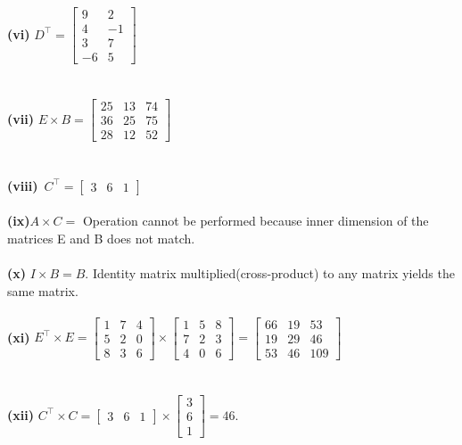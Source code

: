 \documentclass{article}
\begin{document}
\textbf{(vi)} ${D}^\top =
\left[
\begin{matrix}
9&2\\
4&-1\\
3&7\\
-6&5
\end{matrix}
\right]$\\ \\ \\
\textbf{(vii)} $E \times B = \left[
\begin{matrix}
25&13&74\\
36&25&75\\
28&12&52
\end{matrix}
\right]$\\ \\ \\
\textbf{(viii)}\, ${C}^\top =\left[
\begin{matrix}
3&6&1
\end{matrix}
\right]$\\ \\
\textbf{(ix)}$A \times C =$ Operation cannot be performed because inner dimension of the matrices E and B does not match.\\ \\
\textbf{(x)} $I \times B = B$. Identity matrix multiplied(cross-product) to any matrix yields the same matrix.\\ \\
\textbf{(xi)} ${E}^\top \times E =
\left[
\begin{matrix}
1&7&4\\
5&2&0\\
8&3&6
\end{matrix}
\right] \times  
\left[
\begin{matrix}
1&5&8\\
7&2&3\\
4&0&6
\end{matrix}
\right] = 
\left[
\begin{matrix}
66&19&53\\
19&29&46\\
53&46&109
\end{matrix}
\right]$\\ \\ \\
\textbf{(xii)} ${C}^\top \times C = \left[
\begin{matrix}
3&6&1
\end{matrix}
\right]\times \left[
\begin{matrix}
3\\
6\\
1
\end{matrix}
\right] = 46$.\\ \\
\end{document}
